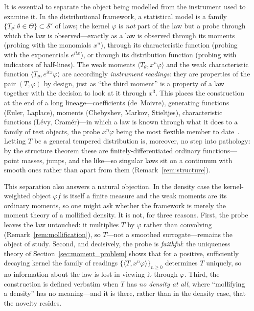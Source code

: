 \documentclass[12pt]{article}
\theoremstyle{definition}
\begin{document}
It is essential to separate the object being modelled from the instrument used to examine it.  In the distributional framework, a statistical model is a family $\{T_\theta:\theta\in\Theta\}\subset\mathcal{S}'$ of laws; the kernel $\varphi$ is \emph{not} part of the law but a probe through which the law is observed---exactly as a law is observed through its moments (probing with the monomials $x^n$), through its characteristic function (probing with the exponentials $e^{itx}$), or through its distribution function (probing with indicators of half-lines).  The weak moments $\langle T_\theta,x^n\varphi\rangle$ and the weak characteristic function $\langle T_\theta,e^{itx}\varphi\rangle$ are accordingly \emph{instrument readings}: they are properties of the pair $(T,\varphi)$ by design, just as ``the third moment'' is a property of a law together with the decision to look at it through $x^3$.  This places the construction at the end of a long lineage---coefficients (de~Moivre), generating functions (Euler, Laplace), moments (Chebyshev, Markov, Stieltjes), characteristic functions (L\'evy, Cram\'er)---in which a law is known through what it does to a family of test objects, the probe $x^n\varphi$ being the most flexible member to date~\cite{LabouriauDeMoivre}.  Letting $T$ be a general tempered distribution is, moreover, no step into pathology: by the structure theorem these are finitely-differentiated ordinary functions---point masses, jumps, and the like---so singular laws sit on a continuum with smooth ones rather than apart from them (Remark~\ref{rem:structure}).

This separation also answers a natural objection.  In the density case the kernel-weighted object $\varphi f$ is itself a finite measure and the weak moments are its ordinary moments, so one might ask whether the framework is merely the moment theory of a mollified density.  It is not, for three reasons.  First, the probe leaves the law untouched: it multiplies $T$ by $\varphi$ rather than convolving (Remark~\ref{rem:mollification}), so $T$---not a smoothed surrogate---remains the object of study.  Second, and decisively, the probe is \emph{faithful}: the uniqueness theory of Section~\ref{sec:moment_problem} shows that for a positive, sufficiently decaying kernel the family of readings $\{\langle T,x^n\varphi\rangle\}_{n\ge0}$ determines $T$ uniquely, so no information about the law is lost in viewing it through $\varphi$.  Third, the construction is defined verbatim when $T$ has \emph{no density at all}, where ``mollifying a density'' has no meaning---and it is there, rather than in the density case, that the novelty resides.
\end{document}
